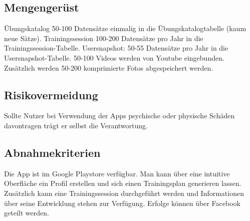 \documentclass[FIPLY_base.tex]{subfiles}
\begin{document}
	\subsection{Mengengerüst}
	Übungskatalog 50-100 Datensätze einmalig in die Übungskatalogtabelle (kaum neue Sätze).
	Trainingssession 100-200 Datensätze pro Jahr in die Trainingssession-Tabelle.
	Usersnapshot: 50-55 Datensätze pro Jahr in die Usersnapshot-Tabelle.
	50-100 Videos werden von Youtube eingebunden.
	Zusätzlich werden 50-200 komprimierte Fotos abgespeichert werden.
	
	\subsection{Risikovermeidung}
	Sollte Nutzer bei Verwendung der Apps psychische oder physische Schäden davontragen trägt er selbst die Verantwortung.
	
	\subsection{Abnahmekriterien}
	Die App ist im Google Playstore verfügbar.
	Man kann über eine intuitive Oberfläche ein Profil erstellen und sich einen Trainingsplan generieren lassen. Zusätzlich kann eine Trainingssession durchgeführt werden und Informationen über seine Entwicklung stehen zur Verfügung.
	Erfolge können über Facebook geteilt werden.
	
\end{document}
